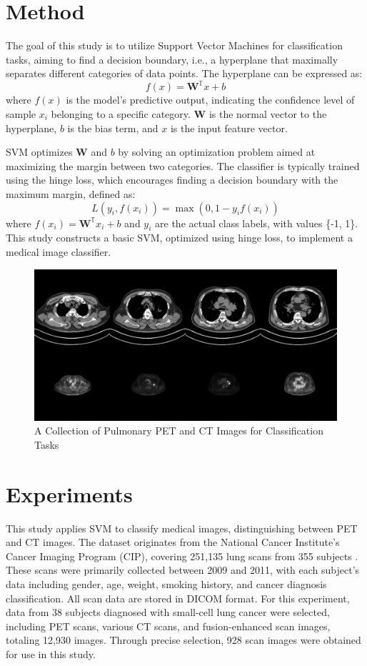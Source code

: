 \documentclass[twocolumn]{article}
\begin{document}
\section{Method}
The goal of this study is to utilize Support Vector Machines for classification tasks, aiming to find a decision boundary, i.e., a hyperplane that maximally separates different categories of data points. The hyperplane can be expressed as:
\[
	f(x) = \mathbf{W}^\mathbb{T} x + b
\]
where \(f(x)\) is the model's predictive output, indicating the confidence level of sample \(x_i\) belonging to a specific category. \( \mathbf{W} \) is the normal vector to the hyperplane, \( b \) is the bias term, and \( x \) is the input feature vector.

SVM optimizes \( \mathbf{W} \) and \( b \) by solving an optimization problem aimed at maximizing the margin between two categories. The classifier is typically trained using the hinge loss, which encourages finding a decision boundary with the maximum margin, defined as:
\[
	L(y_i, f(x_i)) = \max(0, 1 - y_i f(x_i))
\]
where \( f(x_i) = \mathbf{W}^\mathbb{T} x_i + b \) and \( y_i \) are the actual class labels, with values \{-1, 1\}. This study constructs a basic SVM, optimized using hinge loss, to implement a medical image classifier.

\begin{figure}[t!]
	\centering
	\includegraphics[width=1.0\linewidth]{exp_log/imgs/pet-ct}
	\caption{A Collection of Pulmonary PET and CT Images for Classification Tasks}
	\label{fig:pet-ct}
\end{figure}

\section{Experiments}
This study applies SVM to classify medical images, distinguishing between PET and CT images. The dataset originates from the National Cancer Institute's Cancer Imaging Program (CIP), covering 251,135 lung scans from 355 subjects \cite{li_large-scale_2020}. These scans were primarily collected between 2009 and 2011, with each subject's data including gender, age, weight, smoking history, and cancer diagnosis classification. All scan data are stored in DICOM format. For this experiment, data from 38 subjects diagnosed with small-cell lung cancer were selected, including PET scans, various CT scans, and fusion-enhanced scan images, totaling 12,930 images. Through precise selection, 928 scan images were obtained for use in this study.
\end{document}
